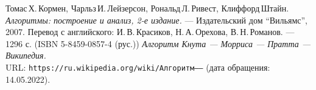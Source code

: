 \begin{thebibliography}{99}
Томас\,Х.\,Кормен, Чарльз\,И.\,Лейзерсон, Рональд\,Л.\,Ривест, Клиффорд\,Штайн.
{\itshape Алгоритмы: построение и анализ, 2-е издание.} --- Издательский дом \enquote{Вильямс}, 2007. Перевод с английского: И.\,В.\,Красиков, Н.\,А.\,Орехова, В.\,Н.\,Романов. --- 1296 с. (ISBN 5-8459-0857-4 (рус.))
{\itshape Алгоритм Кнута — Морриса — Пратта — Википедия.} \\URL: \texttt{https://ru.wikipedia.org/wiki/Алгоритм\textunderscore—\textunderscore—} (дата обращения: 14.05.2022).
\end{thebibliography}
\pagebreak


